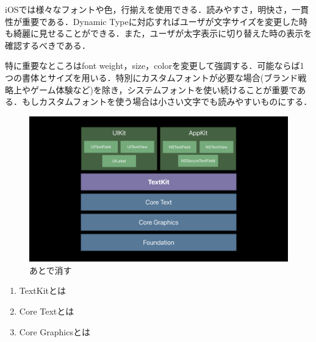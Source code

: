 iOSでは様々なフォントや色，行揃えを使用できる．読みやすさ，明快さ，一貫性が重要である\cite{developer.apple.com:design/human-interface-guidelines/ios/visual-design/typography/}．Dynamic Typeに対応すればユーザが文字サイズを変更した時も綺麗に見せることができる．また，ユーザが太字表示に切り替えた時の表示を確認するべきである\cite{developer.apple.com:design/human-interface-guidelines/ios/views/text-views/}\cite{developer.apple.com:design/design/human-interface-guidelines/ios/controls/labels/}．

特に重要なところはfont weight，size，colorを変更して強調する．可能ならば1つの書体とサイズを用いる\cite{developer.apple.com:design/human-interface-guidelines/ios/visual-design/typography/}．特別にカスタムフォントが必要な場合(ブランド戦略上やゲーム体験など)を除き，システムフォントを使い続けることが重要である．もしカスタムフォントを使う場合は小さい文字でも読みやすいものにする．

\begin{figure}[htbp]
    \begin{center}
        \includegraphics[width=0.8\linewidth]{images/textKit_hierarchie.png}
    \end{center}
    \caption{あとで消す}
\end{figure}

\begin{enumerate}
    \item TextKitとは
    \item Core Textとは
    \item Core Graphicsとは
\end{enumerate}

